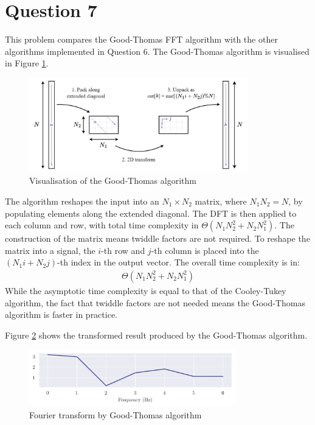 \section*{Question 7}

This problem compares the Good-Thomas FFT algorithm with the other algorithms implemented in Question 6. The Good-Thomas algorithm is visualised in Figure \ref{fig:q7_viz_good_thomas}.

\begin{figure}[ht]
    \centering
    \includegraphics[width=0.85\textwidth]{images/q7_viz_good_thomas.png}
    \caption{Visualisation of the Good-Thomas algorithm}
    \label{fig:q7_viz_good_thomas}
\end{figure}

The algorithm reshapes the input into an $N_1\times N_2$ matrix, where $N_1N_2=N$, by populating elements along the extended diagonal. The DFT is then applied to each column and row, with total time complexity in $\Theta(N_1N_2^2 + N_2N_1^2)$. The construction of the matrix means twiddle factors are not required. To reshape the matrix into a signal, the $i$-th row and $j$-th column is placed into the $(N_1i+N_2j)$-th index in the output vector. The overall time complexity is in:
\begin{align}
    \Theta(N_1N_2^2 + N_2N_1^2)
\end{align}
While the asymptotic time complexity is equal to that of the Cooley-Tukey algorithm, the fact that twiddle factors are not needed means the Good-Thomas algorithm is faster in practice.

Figure \ref{fig:q7_good_thomas} shows the transformed result produced by the Good-Thomas algorithm.

\begin{figure}[ht]
    \centering
    \includegraphics[width=0.8\textwidth]{images/q7_good_thomas.png}
    \caption{Fourier transform by Good-Thomas algorithm}
    \label{fig:q7_good_thomas}
\end{figure}

